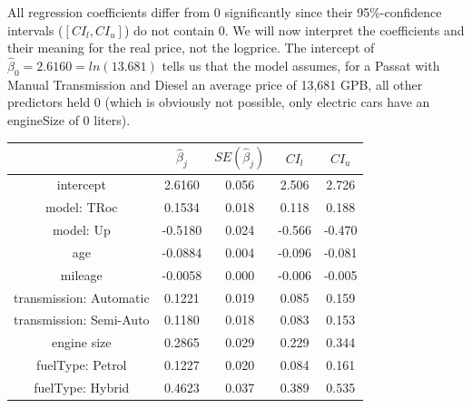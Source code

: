 \documentclass[12 pt]{scrartcl}
\begin{document}
All regression coefficients differ from 0 significantly since their 95\%-confidence intervals ($[CI_l, CI_u]$) do not contain 0.
We will now interpret the coefficients and their meaning for the real price, not the logprice.
The intercept of $\hat{\beta}_0 = 2.6160 = ln(13.681)$ tells us that the model assumes, for a Passat with Manual Transmission and Diesel an average price of 13,681 GPB, all other predictors held 0 (which is obviously not possible, only electric cars have an engineSize of 0 liters).

\begin{table}[ht]
  \centering
  \label{tab:finalregression}
  \begin{tabular}{c|cccc}
                            & $\hat{\beta}_j$ & $SE(\hat{\beta}_j)$ & $CI_l$ & $CI_u$ \\
    \hline
    intercept               & 2.6160          & 0.056               & 2.506  & 2.726  \\
    model: TRoc             & 0.1534          & 0.018               & 0.118  & 0.188  \\
    model: Up               & -0.5180         & 0.024               & -0.566 & -0.470 \\
    age                     & -0.0884         & 0.004               & -0.096 & -0.081 \\
    mileage                 & -0.0058         & 0.000               & -0.006 & -0.005 \\
    transmission: Automatic & 0.1221          & 0.019               & 0.085  & 0.159  \\
    transmission: Semi-Auto & 0.1180          & 0.018               & 0.083  & 0.153  \\
    engine size             & 0.2865          & 0.029               & 0.229  & 0.344  \\
    fuelType: Petrol        & 0.1227          & 0.020               & 0.084  & 0.161  \\
    fuelType: Hybrid        & 0.4623          & 0.037               & 0.389  & 0.535  \\
  \end{tabular}
\end{table}
\end{document}
